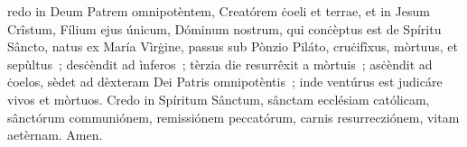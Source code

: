 redo in Deum Patrem omnipotèntem, Creatórem ċoeli et terrae, et in Jesum Crîstum, Fílium ejus únicum, Dóminum nostrum, qui conċèptus est de Spíritu Sâncto, natus ex María Vìrġine, passus sub Pònzio Piláto, cruċifîxus, mòrtuus, et sepùltus~; desċèndit ad ìnferos~; tèrzia die resurrêxit a mòrtuis~; asċèndit ad ċoelos, sèdet ad dèxteram Dei Patris omnipotèntis~; inde ventúrus est judicáre vivos et mòrtuos. Credo in Spíritum Sânctum, sânctam ecclésiam católicam, sânctórum communiónem, remissiónem peccatórum, carnis resurrecziónem, vitam aetèrnam.
Amen.
